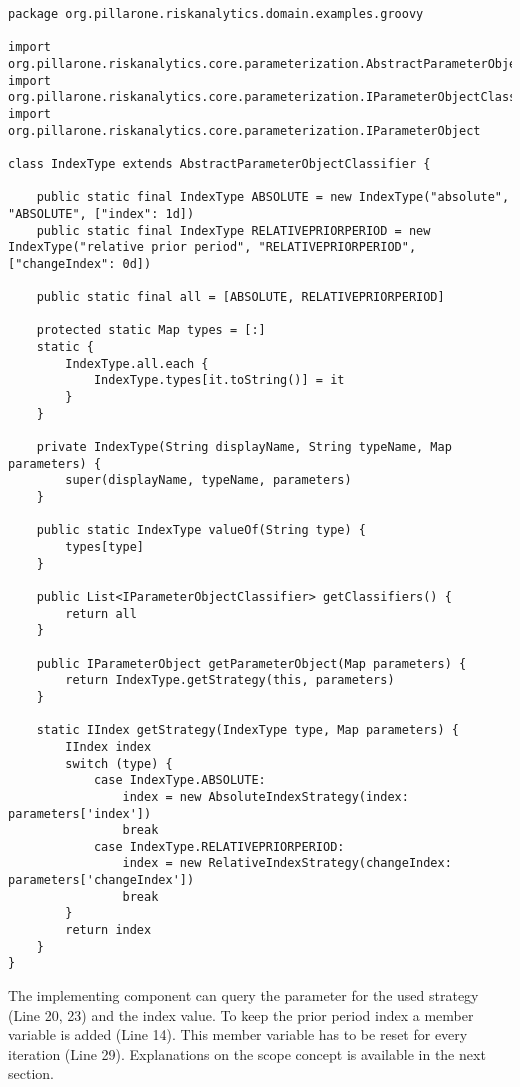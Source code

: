 \begin{lstlisting}[label=lst:strategytypes]
package org.pillarone.riskanalytics.domain.examples.groovy

import org.pillarone.riskanalytics.core.parameterization.AbstractParameterObjectClassifier
import org.pillarone.riskanalytics.core.parameterization.IParameterObjectClassifier
import org.pillarone.riskanalytics.core.parameterization.IParameterObject

class IndexType extends AbstractParameterObjectClassifier {

    public static final IndexType ABSOLUTE = new IndexType("absolute", "ABSOLUTE", ["index": 1d])
    public static final IndexType RELATIVEPRIORPERIOD = new IndexType("relative prior period", "RELATIVEPRIORPERIOD", ["changeIndex": 0d])

    public static final all = [ABSOLUTE, RELATIVEPRIORPERIOD]

    protected static Map types = [:]
    static {
        IndexType.all.each {
            IndexType.types[it.toString()] = it
        }
    }

    private IndexType(String displayName, String typeName, Map parameters) {
        super(displayName, typeName, parameters)
    }

    public static IndexType valueOf(String type) {
        types[type]
    }

    public List<IParameterObjectClassifier> getClassifiers() {
        return all
    }

    public IParameterObject getParameterObject(Map parameters) {
        return IndexType.getStrategy(this, parameters)
    }

    static IIndex getStrategy(IndexType type, Map parameters) {
        IIndex index
        switch (type) {
            case IndexType.ABSOLUTE:
                index = new AbsoluteIndexStrategy(index: parameters['index'])
                break
            case IndexType.RELATIVEPRIORPERIOD:
                index = new RelativeIndexStrategy(changeIndex: parameters['changeIndex'])
                break
        }
        return index
    }
}
\end{lstlisting}

The implementing component can query the parameter for the used strategy (Line 20, 23) and the index value. To keep the prior period index a member variable is added (Line 14). This member variable has to be reset for every iteration (Line 29). Explanations on the scope concept is available in the next section.


